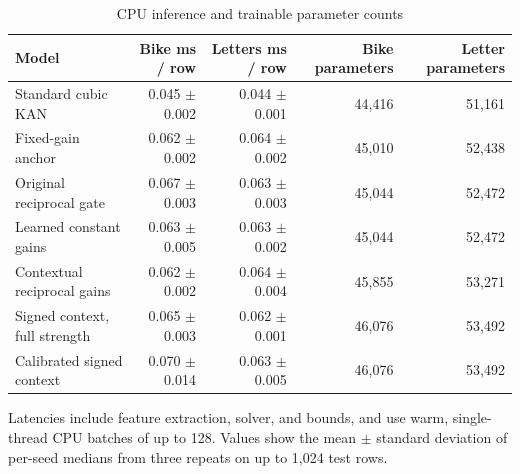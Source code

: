 \begin{table}[t]
\centering
\small
\caption{CPU inference and trainable parameter counts}
\label{tab:cpu_and_parameters}
\begin{tabular}{@{}lrrrr@{}}
\toprule
\textbf{Model} & \textbf{Bike ms / row} & \textbf{Letters ms / row} & \textbf{Bike parameters} & \textbf{Letter parameters} \\
\midrule
Standard cubic KAN & 0.045 \ensuremath{\pm} 0.002 & 0.044 \ensuremath{\pm} 0.001 & 44,416 & 51,161 \\
Fixed-gain anchor & 0.062 \ensuremath{\pm} 0.002 & 0.064 \ensuremath{\pm} 0.002 & 45,010 & 52,438 \\
Original reciprocal gate & 0.067 \ensuremath{\pm} 0.003 & 0.063 \ensuremath{\pm} 0.003 & 45,044 & 52,472 \\
Learned constant gains & 0.063 \ensuremath{\pm} 0.005 & 0.063 \ensuremath{\pm} 0.002 & 45,044 & 52,472 \\
Contextual reciprocal gains & 0.062 \ensuremath{\pm} 0.002 & 0.064 \ensuremath{\pm} 0.004 & 45,855 & 53,271 \\
Signed context, full strength & 0.065 \ensuremath{\pm} 0.003 & 0.062 \ensuremath{\pm} 0.001 & 46,076 & 53,492 \\
Calibrated signed context & 0.070 \ensuremath{\pm} 0.014 & 0.063 \ensuremath{\pm} 0.005 & 46,076 & 53,492 \\
\bottomrule
\end{tabular}
\par\medskip
\begin{minipage}{0.98\linewidth}\footnotesize Latencies include feature extraction, solver, and bounds, and use warm, single-thread CPU batches of up to 128. Values show the mean \ensuremath{\pm} standard deviation of per-seed medians from three repeats on up to 1,024 test rows.\end{minipage}
\end{table}
